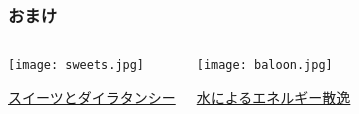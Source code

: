 \documentclass[12pt, dvipdfmx]{beamer}
\newcommand{\backupbegin}{
   \newcounter{framenumberappendix}
   \setcounter{framenumberappendix}{\value{framenumber}}
}
\newcommand{\backupend}{
   \addtocounter{framenumberappendix}{-\value{framenumber}}
   \addtocounter{framenumber}{\value{framenumberappendix}} 
}
\begin{document}
\begin{frame}
	\frametitle{おまけ}
		\begin{columns}[T, onlytextwidth]
				\begin{center}
					\texttt{[image: sweets.jpg]}

					\href{https://www.youtube.com/watch?v=wKZDOLWjd7Y}{スイーツとダイラタンシー}
				\end{center}
				\begin{center}
					\texttt{[image: baloon.jpg]}

					\href{https://www.youtube.com/watch?v=kRLJti62CGE}{水によるエネルギー散逸}
				\end{center}
		\end{columns}
	

	
\end{frame}




\end{document}
